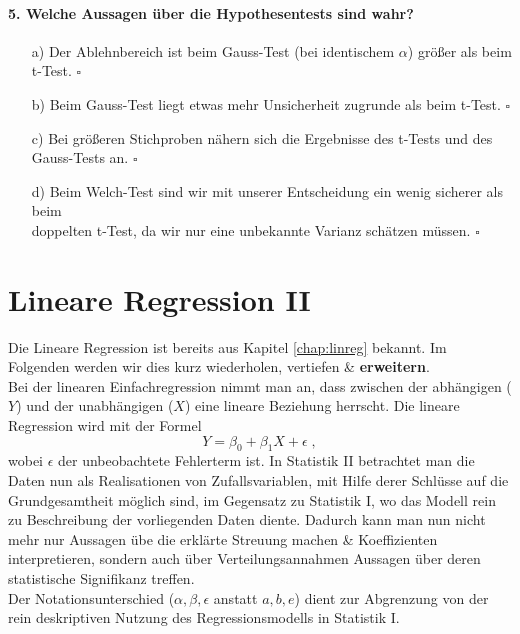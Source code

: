 \documentclass[a4paper]{article}
\newcommand\dangersign[1][2ex]{%
  \renewcommand\stacktype{L}%
  \scaleto{\stackon[1.3pt]{\color{red}$\triangle$}{\tiny !}}{#1}%
}
\begin{document}
 \paragraph{5. Welche Aussagen über die Hypothesentests sind wahr?} \begin{itemize}
    \item[a)] Der Ablehnbereich ist beim Gauss-Test (bei identischem $\alpha$) größer als beim t-Test. \hfill $\square$
    \item[b)] Beim Gauss-Test liegt etwas mehr Unsicherheit zugrunde als beim t-Test. \hfill $\square$
    \item[c)] Bei größeren Stichproben nähern sich die Ergebnisse des t-Tests und des Gauss-Tests an. \hfill $\square$
    \item[d)] Beim Welch-Test sind wir mit unserer Entscheidung ein wenig sicherer als beim \\doppelten t-Test, da wir nur eine unbekannte Varianz schätzen müssen. \hfill $\square$
 \end{itemize}  


\clearpage


\section{Lineare Regression II}\label{chap:mult-reg}
Die Lineare Regression ist bereits aus Kapitel \ref{chap:linreg} bekannt. Im Folgenden werden wir dies kurz wiederholen, vertiefen \& \textbf{erweitern}.\\
Bei der linearen Einfachregression nimmt man an, dass zwischen der abhängigen ($Y$) und der unabhängigen ($X$) eine lineare Beziehung herrscht. Die lineare Regression wird mit der Formel 
$$Y = \beta_0 + \beta_1X + \epsilon\;,$$ 
\noindent wobei $\epsilon$ der unbeobachtete Fehlerterm ist. In Statistik II betrachtet man die Daten nun als Realisationen von Zufallsvariablen, mit Hilfe derer Schlüsse auf die Grundgesamtheit möglich sind, im Gegensatz zu Statistik I, wo das Modell rein zu Beschreibung der vorliegenden Daten diente. Dadurch kann man nun nicht mehr nur Aussagen übe die erklärte Streuung machen \& Koeffizienten interpretieren, sondern auch über Verteilungsannahmen Aussagen über deren statistische Signifikanz treffen.\\

\noindent\dangersign[3ex] Der Notationsunterschied ($\alpha, \beta, \epsilon$ anstatt $a, b, e$) dient zur Abgrenzung von der rein deskriptiven Nutzung des Regressionsmodells in Statistik I.
\end{document}
